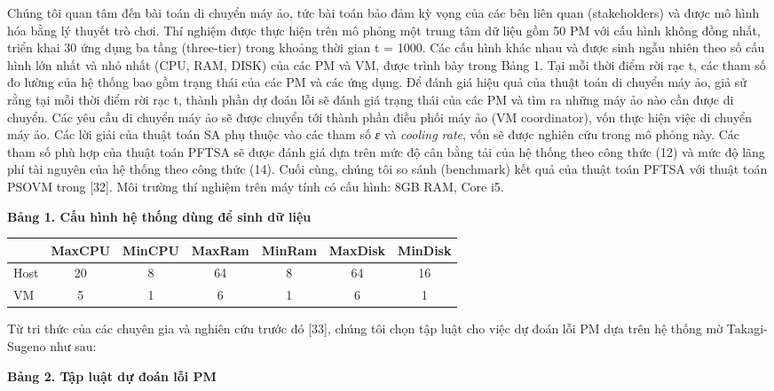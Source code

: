 \documentclass[
  vietnamese,
]{article}
\newcounter{none} %
\begin{document}
Chúng tôi quan tâm đến bài toán di chuyển máy ảo, tức bài toán bảo đảm kỳ
vọng của các bên liên quan (stakeholders) và được mô hình hóa bằng lý
thuyết trò chơi. Thí nghiệm được thực hiện trên mô phỏng một trung tâm
dữ liệu gồm 50 PM với cấu hình không đồng nhất, triển khai 30 ứng dụng
ba tầng (three-tier) trong khoảng thời gian t = 1000. Các cấu hình khác
nhau và được sinh ngẫu nhiên theo số cấu hình lớn nhất và nhỏ nhất (CPU,
RAM, DISK) của các PM và VM, được trình bày trong Bảng 1. Tại mỗi thời
điểm rời rạc t, các tham số đo lường của hệ thống bao gồm trạng thái của
các PM và các ứng dụng. Để đánh giá hiệu quả của thuật toán di chuyển
máy ảo, giả sử rằng tại mỗi thời điểm rời rạc t, thành phần dự đoán lỗi
sẽ đánh giá trạng thái của các PM và tìm ra những máy ảo nào cần được di
chuyển. Các yêu cầu di chuyển máy ảo sẽ được chuyển tới thành phần điều
phối máy ảo (VM coordinator), vốn thực hiện việc di chuyển máy ảo. Các
lời giải của thuật toán SA phụ thuộc vào các tham số \emph{ε} và
\emph{cooling rate}, vốn sẽ được nghiên cứu trong mô phỏng này. Các tham
số phù hợp của thuật toán PFTSA sẽ được đánh giá dựa trên mức độ cân
bằng tải của hệ thống theo công thức (12) và mức độ lãng phí tài nguyên
của hệ thống theo công thức (14). Cuối cùng, chúng tôi so sánh
(benchmark) kết quả của thuật toán PFTSA với thuật toán PSOVM trong
{[}32{]}. Môi trường thí nghiệm trên máy tính có cấu hình: 8GB RAM, Core
i5.

\textbf{Bảng 1. Cấu hình hệ thống dùng để sinh dữ liệu}

{\def\LTcaptype{none} %
\begin{longtable}[]{@{}lcccccc@{}}
\toprule\noalign{}
& MaxCPU & MinCPU & MaxRam & MinRam & MaxDisk & MinDisk \\
\midrule\noalign{}
\endhead
\bottomrule\noalign{}
\endlastfoot
Host & 20 & 8 & 64 & 8 & 64 & 16 \\
VM & 5 & 1 & 6 & 1 & 6 & 1 \\
\end{longtable}
}

Từ tri thức của các chuyên gia và nghiên cứu trước đó {[}33{]}, chúng
tôi chọn tập luật cho việc dự đoán lỗi PM dựa trên hệ thống mờ
Takagi-Sugeno như sau:

\textbf{Bảng 2. Tập luật dự đoán lỗi PM}
\end{document}

